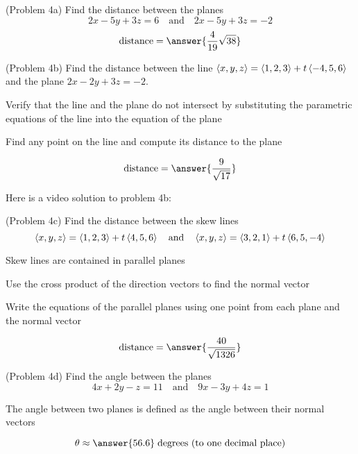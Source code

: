 \documentclass[handout]{ximera}
\begin{document}
\begin{problem}(Problem 4a)
Find the distance between the planes 
\[
2x -5y + 3z = 6 \quad \text{and} \quad 2x-5y+3z = -2
\]
\[
    \text{distance} = \answer{\frac{4}{19}\sqrt{38}}
\]
\end{problem}

\begin{problem}(Problem 4b)
Find the distance between the line $\left\langle x, y, z\right\rangle = \left\langle 1, 2, 3\right\rangle + t\left\langle -4, 5, 6\right\rangle$ and the plane $2x-2y+3z = -2$.\\
\begin{hint}
Verify that the line and the plane do not intersect by substituting the parametric equations 
of the line into the equation of the plane
\end{hint}
\begin{hint}
Find any point on the line and compute its distance to the plane
\end{hint}
\[
   \text{distance} = \answer{\frac{9}{\sqrt{17}}}
\]
\end{problem}

Here is a video solution to problem 4b:\\
\begin{foldable}
\end{foldable}

\begin{problem}(Problem 4c)
Find the distance between the skew lines 
\[
    \left\langle x, y, z\right\rangle = \left\langle 1, 2, 3\right\rangle + t\left\langle 4, 5, 6\right\rangle\quad \text{and} \quad \left\langle x, y, z\right\rangle = \left\langle 3, 2, 1\right\rangle + t\left\langle 6, 5, -4\right\rangle
\]
\begin{hint}
Skew lines are contained in parallel planes
\end{hint}
\begin{hint}
Use the cross product of the direction vectors to find the normal vector
\end{hint}
\begin{hint}
Write the equations of the parallel planes using one point from each plane and the normal vector
\end{hint}
\[
   \text{distance} = \answer{\frac{40}{\sqrt{1326}}}
\]
\end{problem}

\begin{problem}(Problem 4d)
Find the angle between the planes
\[
4x + 2y - z = 11 \quad \text{and} \quad 9x - 3y + 4z = 1
\]
\begin{hint}
The angle between two planes is defined as the angle between their normal vectors
\end{hint}
\[
\theta \approx \answer{56.6} \; \text{degrees (to one decimal place)}
\]
\end{problem}
\end{document}
